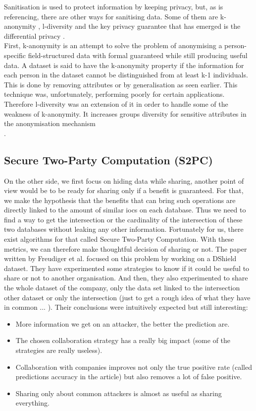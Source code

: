 \documentclass{eplmastersthesis}
\begin{document}
Sanitisation is used to protect information by keeping privacy, but, as \cite{mohaisen2017rethinking} is referencing, there are other ways for sanitising data. Some of them are k-anonymity \cite{sweeney2002k}, l-diversity \cite{machanavajjhala2007diversity} and the key privacy guarantee that has emerged is the differential privacy \cite{dwork2008differential}.\\
First, k-anonymity is an attempt to solve the problem of anonymising a person-specific field-structured data with formal guaranteed while still producing useful data. A dataset is said to have the k-anonymity property if the information for each person in the dataset cannot be distinguished from at least k-1 individuals. This is done by removing attributes or by generalisation as seen earlier. This technique was, unfortunately, performing poorly for certain applications. Therefore l-diversity was an extension of it in order to handle some of the weakness of k-anonymity. It increases groups diversity for sensitive attributes in the anonymisation mechanism\\.

\subsection{Secure Two-Party Computation (S2PC)}
On the other side, we first focus on hiding data while sharing, another point of view would be to be ready for sharing only if a benefit is guaranteed. For that, we make the hypothesis that the benefits that can bring such operations are directly linked to the amount of similar \gls{ioc}s on each database.
Thus we need to find a way to get the intersection or the cardinality of the intersection of these two databases without leaking any other information. Fortunately for us, there exist algorithms for that called Secure Two-Party Computation.
With these metrics, we can therefore make thoughtful decision of sharing or not.
The paper written by Freudiger et al.\cite{freudiger2015controlled} focused on this problem by working on a DShield dataset. They have experimented some strategies to know if it could be useful to share or not to another organisation. And then, they also experimented to share the whole dataset of the company, only the data set linked to the intersection other dataset or only the intersection (just to get a rough idea of what they have in common ... ).
Their conclusions were intuitively expected but still interesting:
\begin{itemize}
\item More information we get on an attacker, the better the prediction are.
\item The chosen collaboration strategy has a really big impact (some of the strategies are really useless).
\item Collaboration with companies improves not only the true positive rate (called predictions accuracy in the article) but also removes a lot of false positive.
\item Sharing only about common attackers is almost as useful as sharing everything.
\end{itemize}
\end{document}
